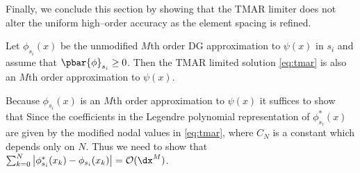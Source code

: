 \documentclass{ametsoc}
\begin{document}
Finally, we conclude this section by showing that the TMAR limiter does not alter the uniform high--order accuracy as the element spacing is refined.
\begin{thm} \label{thm:acc}
Let $\phi_{s_i}(x)$ be the unmodified $M$th order DG approximation to $\psi(x)$ in $s_i$ and assume that $\pbar{\phi}_{s_i} \geq 0$. Then the TMAR limited solution \eqref{eq:tmar} is also an $M$th order approximation to $\psi(x)$.
\end{thm}
\begin{pf}
Because $\phi_{s_i}(x)$ is an $M$th order approximation to $\psi(x)$
it suffices to show that 
Since the coefficients in the Legendre polynomial representation of $\phi^*_{s_i}(x)$ are given by the modified nodal values in \eqref{eq:tmar},
where $C_N$ is a constant which depends only on $N$. Thus we need to show that $\sum_{k=0}^N \left| \phi^*_{s_i}(x_k) - \phi_{s_i}(x_k) \right| = \mathcal{O}(\dx^{M})$. 


\end{pf}
\end{document}
